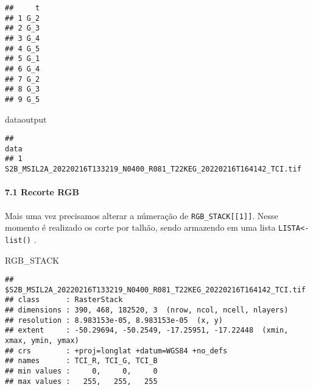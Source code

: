 \documentclass[
]{article}
\newenvironment{Shaded}{\begin{snugshade}}{\end{snugshade}}
\newcommand{\FunctionTok}[1]{\textcolor[rgb]{0.00,0.00,0.00}{#1}}
\newcommand{\NormalTok}[1]{#1}
\newcommand{\OtherTok}[1]{\textcolor[rgb]{0.56,0.35,0.01}{#1}}
\newcommand{\SpecialCharTok}[1]{\textcolor[rgb]{0.00,0.00,0.00}{#1}}
\newcommand{\StringTok}[1]{\textcolor[rgb]{0.31,0.60,0.02}{#1}}
\begin{document}
\begin{verbatim}
##     t
## 1 G_2
## 2 G_3
## 3 G_4
## 4 G_5
## 5 G_1
## 6 G_4
## 7 G_2
## 8 G_3
## 9 G_5
\end{verbatim}

\begin{Shaded}
\begin{Highlighting}[]
\NormalTok{dataoutput}
\end{Highlighting}
\end{Shaded}

\begin{verbatim}
##                                                                   data
## 1 S2B_MSIL2A_20220216T133219_N0400_R081_T22KEG_20220216T164142_TCI.tif
\end{verbatim}

\begin{Shaded}
\end{Shaded}

\hypertarget{recorte-rgb}{%
\paragraph{7.1 Recorte RGB}\label{recorte-rgb}}

Mais uma vez precisamos alterar a númeração de
\texttt{RGB\_STACK{[}{[}1{]}{]}}. Nesse momento é realizado os corte por
talhão, sendo armazendo em uma lista \texttt{LISTA\textless{}-list()} .

\begin{Shaded}
\begin{Highlighting}[]
\NormalTok{RGB\_STACK}
\end{Highlighting}
\end{Shaded}

\begin{verbatim}
## $S2B_MSIL2A_20220216T133219_N0400_R081_T22KEG_20220216T164142_TCI.tif
## class      : RasterStack 
## dimensions : 390, 468, 182520, 3  (nrow, ncol, ncell, nlayers)
## resolution : 8.983153e-05, 8.983153e-05  (x, y)
## extent     : -50.29694, -50.2549, -17.25951, -17.22448  (xmin, xmax, ymin, ymax)
## crs        : +proj=longlat +datum=WGS84 +no_defs 
## names      : TCI_R, TCI_G, TCI_B 
## min values :     0,     0,     0 
## max values :   255,   255,   255
\end{verbatim}
\end{document}
